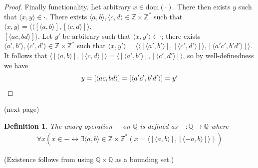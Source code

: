 \documentclass{report}
\newtheorem{definition}[theo]{Definition}
\begin{document}
\begin{proof}
\indent Finally functionality. Let arbitrary $x\in\text{dom}(\cdot)$. There then exists $y$ such that $\langle x,y\rangle\in\cdot$.
There exists $\langle a,b\rangle,\langle c,d\rangle\in\mathbb Z\times\mathbb Z^*$ such that 
$\langle x,y\rangle=\langle\langle[\langle a,b\rangle],[\langle c,d\rangle]\rangle$,\\$[\langle ac,bd\rangle]\rangle$. Let $y'$ be arbitrary such that $\langle x,y'\rangle\in\cdot$; 
there exists $\langle a',b'\rangle,\langle c',d'\rangle\in\mathbb Z\times\mathbb Z^*$ such that 
$\langle x,y'\rangle=\langle\langle[\langle a',b'\rangle],[\langle c',d'\rangle]\rangle,[\langle a'c',b'd'\rangle]\rangle$.
It follows that 
$\langle[\langle a,b\rangle],[\langle c,d\rangle]\rangle=\langle[\langle a',b'\rangle],[\langle c',d'\rangle]\rangle$, so by well-definedness we have 
\begin{equation*}
y=[\langle ac,bd\rangle]=[\langle a'c',b'd'\rangle]=y'\qedhere
\end{equation*}
\end{proof}
\noindent(next page)\newpage
\begin{definition}
The unary operation $-$ on $\mathbb Q$ is defined as $-:\mathbb Q\to\mathbb Q$ where
\begin{align*}
\forall x(x\in-\leftrightarrow\exists\langle a,b\rangle\in\mathbb Z\times\mathbb Z^*
(x=\langle[\langle a,b\rangle],[\langle -a,b\rangle]\rangle))
\end{align*}
\end{definition}
\noindent(Existence follows from using $\mathbb Q\times\mathbb Q$ as a bounding set.)
\end{document}
